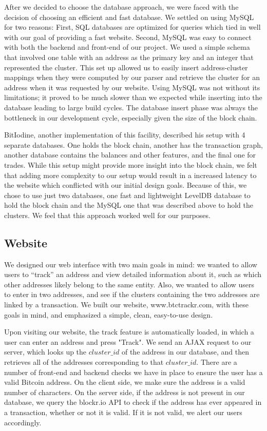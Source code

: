 \documentclass[10pt, letterpaper, twocolumn, twoside]{article}
\begin{document}
After we decided to choose the database approach, we were faced with the decision of choosing an efficient and fast database. We settled on using MySQL for two reasons: First, SQL databases are optimized for queries which tied in well with our goal of providing a fast website. Second, MySQL was easy to connect with both the backend and front-end of our project. We used a simple schema that involved one table with an address as the primary key and an integer that represented the cluster. This set up allowed us to easily insert address-cluster mappings when they were computed by our parser and retrieve the cluster for an address when it was requested by our website. Using MySQL was not without its limitations; it proved to be much slower than we expected while inserting into the database leading to large build cycles. The database insert phase was always the bottleneck in our development cycle, especially given the size of the block chain.

BitIodine, another implementation of this facility, described his setup with 4 separate databases. One holds the block chain, another has the transaction graph, another database contains the balances and other features, and the final one for trades. While this setup might provide more insight into the block chain, we felt that adding more complexity to our setup would result in a increased latency to the website which conflicted with our initial design goals. Because of this, we chose to use just two databases, one fast and lightweight LevelDB database to hold the block chain and the MySQL one that was described above to hold the clusters. We feel that this approach worked well for our purposes.

\subsection{Website}
We designed our web interface with two main goals in mind: we wanted to allow users to ``track'' an address and view detailed information about it, such as which other addresses likely belong to the same entity. Also, we wanted to allow users to enter in two addresses, and see if the clusters containing the two addresses are linked by a transaction. We built our website, www.btctrackr.com, with these goals in mind, and emphasized a simple, clean, easy-to-use design.

Upon visiting our website, the track feature is automatically loaded, in which a user can enter an address and press "Track". We send an AJAX request to our server, which looks up the $cluster\_id$ of the address in our database, and then retrieves all of the addresses corresponding to that $cluster\_id$. There are a number of front-end and backend checks we have in place to ensure the user has a valid Bitcoin address. On the client side, we make sure the address is a valid number of characters. On the server side, if the address is not present in our database, we query the blockr.io API to check if the address has ever appeared in a transaction, whether or not it is valid. If it is not valid, we alert our users accordingly.
\end{document}
